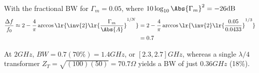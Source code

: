 {%
With the fractional BW for \( \Gamma_m = 0.05 \), where \( 10 \log_{10} \Abs{\Gamma_m}^2 = -26 \si{dB} \)
\begin{equation}\label{eqn:uwavesDeck7MultisectionTransformersCore:920}
\begin{aligned}
\frac{\Delta f}{f_0}
\approx
2 - \frac{4}{\pi} \arccos\lr{ \inv{2} \lr{ \frac{\Gamma_m}{\Abs{A}} }^{1/N} }
&=
2 - \frac{4}{\pi} \arccos\lr{ \inv{2} \lr{ \frac{0.05}{0.0433} }^{1/3} }
\\ &= 0.7
\end{aligned}
\end{equation}

At \( 2 \si{GHz} \), \( BW = 0.7 (70\%) = 1.4 \si{GHz} \), or \( [2.3,2.7] \si{GHz} \), whereas a single \( \lambda/4 \) transformer \( Z_T = \sqrt{ (100)(50) } = 70.7 \Omega \) yields a BW of just \( 0.36 \si{GHz} \) (18\%).
} %
